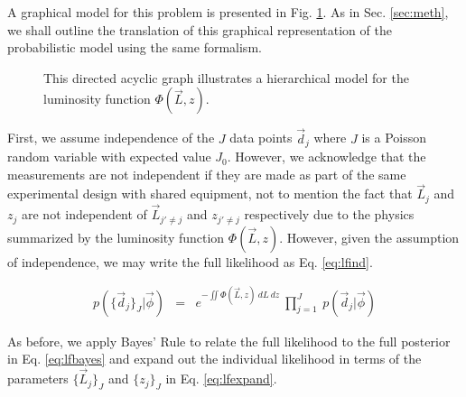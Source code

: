 \documentclass[preprint]{aastex}
\begin{document}
A graphical model for this problem is presented in Fig. \ref{fig:lf}.  As in 
Sec. \ref{sec:meth}, we shall outline the translation of this graphical 
representation of the probabilistic model using the same formalism.

\begin{figure}
\vspace{0.5cm}
\begin{center}
\caption{This directed acyclic graph illustrates a hierarchical model for the 
luminosity function $\Phi(\vec{L},z)$.}
\label{fig:lf}
\end{center}
\end{figure}

First, we assume independence of the $J$ data points $\vec{d}_{j}$ where $J$ is 
a Poisson random variable with expected value $J_{0}$.  However, we acknowledge 
that the measurements are not independent if they are made as part of the same 
experimental design with shared equipment, not to mention the fact that 
$\vec{L}_{j}$ and $z_{j}$ are not independent of $\vec{L}_{j'\neq j}$ and 
$z_{j'\neq j}$ respectively due to the physics summarized by the luminosity 
function $\Phi(\vec{L},z)$.  However, given the assumption of independence, we 
may write the full likelihood as Eq. \ref{eq:lfind}.  

\begin{eqnarray}
\label{eq:lfind}
p(\{\vec{d}_{j}\}_{J}|\vec{\phi}) &=& e^{-\iint \Phi(\vec{L},z)\ dL\ dz}\ 
\prod_{j=1}^{J}\ p(\vec{d}_{j}|\vec{\phi})
\end{eqnarray}

As before, we apply Bayes' Rule to relate the full likelihood to the full 
posterior in Eq. \ref{eq:lfbayes} and expand out the individual likelihood in 
terms of the parameters $\{\vec{L}_{j}\}_{J}$ and $\{z_{j}\}_{J}$ in Eq. 
\ref{eq:lfexpand}.
\end{document}
